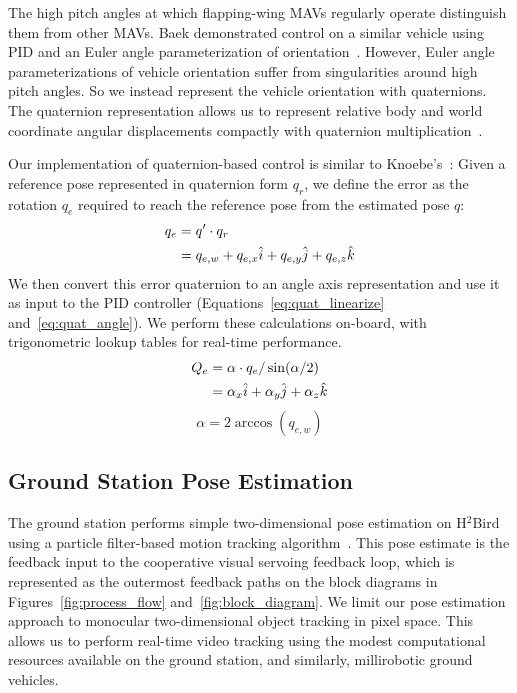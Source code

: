 \documentclass{aamas2013}
\begin{document}
The high pitch angles at which flapping-wing MAVs regularly operate 
distinguish them from other MAVs. Baek demonstrated control on a similar 
vehicle using PID and an Euler angle parameterization of orientation~\cite{baek:tracking}. 
However, Euler angle parameterizations of vehicle orientation suffer from 
singularities around high pitch angles. So we instead represent the vehicle 
orientation with quaternions. The quaternion representation allows us to 
represent relative body and world coordinate angular displacements compactly 
with quaternion multiplication~\cite{hamilton1866elements}.

Our implementation of quaternion-based control is similar to 
Knoebe's~\cite{knoebe:quatcontrol}:
Given a reference pose represented in quaternion form $q_r$, we define the 
error as the rotation $q_e$ required to reach the reference pose from the 
estimated pose $q$:
\begin{align}
\label{eq:quat_error}
q_e &= q^{\prime}\cdot q_r \\
		&= q_{e,w} + q_{e,x}\hat{i} + q_{e,y}\hat{j} + q_{e,z}\hat{k} \notag 
\end{align}
We then convert this error quaternion to an angle axis representation and 
use it as input to the PID controller (Equations~\ref{eq:quat_linearize} and~\ref{eq:quat_angle}).
We perform these calculations on-board, with trigonometric lookup tables for 
real-time performance.
\begin{align}
\label{eq:quat_linearize}
Q_e &= \alpha\cdot q_e/\sin(\alpha /2) \\
		&= \alpha_{x}\hat{i} + \alpha_{y}\hat{j} + \alpha_{z}\hat{k} \notag
\end{align}
\begin{equation}
\label{eq:quat_angle}
\alpha = 2\arccos(q_{e,w})
\end{equation}

\subsection{Ground Station Pose Estimation}
The ground station performs simple two-dimensional pose estimation on 
H$^2$Bird using a particle filter-based motion tracking algorithm~\cite{thrun2005probabilistic}. This pose 
estimate is the feedback input to the cooperative visual servoing feedback 
loop, which is represented as the outermost feedback paths on the block 
diagrams in Figures~\ref{fig:process_flow} and~\ref{fig:block_diagram}. We 
limit our pose estimation approach to monocular two-dimensional object 
tracking in pixel space. This allows us to perform real-time video tracking 
using the modest computational resources available on the ground station, 
and similarly, millirobotic ground vehicles.
\end{document}
